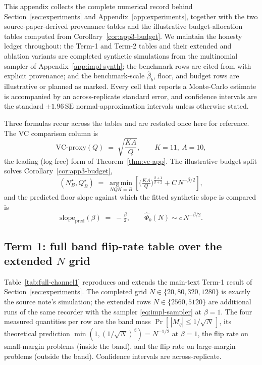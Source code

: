 \documentclass{article} %
\providecommand{\argmin}{\mathop{\mathrm{arg\,min}}\limits}
\begin{document}
This appendix collects the complete numerical record behind
Section~\ref{sec:experiments} and Appendix~\ref{app:experiments}, together with
the two source-paper-derived provenance tables and the illustrative
budget-allocation tables computed from Corollary~\ref{cor:app3-budget}. We
maintain the honesty ledger throughout: the Term-1 and Term-2 tables and
their extended and ablation variants are completed synthetic simulations from
the multinomial sampler of Appendix~\ref{app:impl-synth}; the benchmark rows are
cited from \cite{komiyama2026best} with explicit provenance; and the
benchmark-scale $\widehat\beta_b$, floor, and budget rows are illustrative or
planned as marked. Every cell that reports a Monte-Carlo estimate is
accompanied by an across-replicate standard error, and confidence intervals are
the standard $\pm 1.96\,\mathrm{SE}$ normal-approximation intervals unless
otherwise stated.

Three formulas recur across the tables and are restated once here for
reference. The VC comparison column is
\begin{equation}
\label{eq:tab-vc}
\mathrm{VC\text{-}proxy}(Q) \;=\; \sqrt{\frac{K A}{Q}},
\qquad K=11,\ A=10,
\end{equation}
the leading (log-free) form of Theorem~\ref{thm:vc-app}. The illustrative budget
split solves Corollary~\ref{cor:app3-budget},
\begin{equation}
\label{eq:tab-budget}
(N_B^\star, Q_B^\star)
\;=\;
\argmin_{NQK=B}
\left[
\Big(\tfrac{KA}{Q}\Big)^{\frac{\beta+1}{\beta+2}}
+ C\,N^{-\beta/2}
\right],
\end{equation}
and the predicted floor slope against which the fitted synthetic slope is
compared is
\begin{equation}
\label{eq:tab-slope}
\text{slope}_{\mathrm{pred}}(\beta) \;=\; -\tfrac{\beta}{2},
\qquad
\widehat\Phi_b(N) \sim c\,N^{-\beta/2}.
\end{equation}

\subsection{Term 1: full band flip-rate table over the extended \texorpdfstring{$N$}{N} grid}
\label{app:tab-channel1}

Table~\ref{tab:full-channel1} reproduces and extends the main-text Term-1
result of Section~\ref{sec:experiments}. The completed grid
$N\in\{20,80,320,1280\}$ is exactly the source note's simulation; the extended
rows $N\in\{2560,5120\}$ are additional runs of the same recorder with the
sampler \eqref{eq:impl-sampler} at $\beta=1$. The four measured quantities per
row are the band mass $\Pr[\,|M_q|\le 1/\sqrt N\,]$, its theoretical prediction
$\min(1,(1/\sqrt N)^\beta)=N^{-1/2}$ at $\beta=1$, the flip rate on
small-margin problems (inside the band), and the flip rate on large-margin
problems (outside the band). Confidence intervals are across-replicate.
\end{document}
